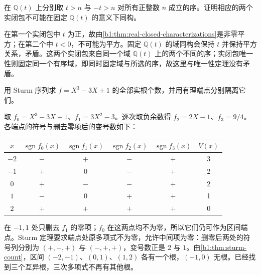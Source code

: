 \begin{exercise}\label{b1:ex:E-real-closure-order}
	在 \(\mathbb Q(t)\) 上分别取 \(t>n\) 与 \(-t>n\) 对所有正整数 \(n\) 成立的序。证明相应的两个实闭包不可能在固定 \(\mathbb Q(t)\) 的意义下同构。
\end{exercise}

\begin{solution}
	在第一个实闭包中 \(t\) 为正，故由\cref{b1:thm:real-closed-characterizations}是非零平方；在第二个中 \(t<0\)，不可能为平方。固定 \(\mathbb Q(t)\) 的域同构会保持 \(t\) 并保持平方关系，矛盾。这两个实闭包来自同一个域 \(\mathbb Q(t)\) 上的两个不同的序；实闭包唯一性则固定同一个有序域，即同时固定域与所选的序，故这里与唯一性定理没有矛盾。
\end{solution}

\begin{exercise}\label{b1:ex:E-sturm-cubic}
	用 Sturm 序列求 \(f=X^3-3X+1\) 的全部实根个数，并用有理端点分别隔离它们。
\end{exercise}

\begin{solution}
	取 \(f_0=X^3-3X+1\)、\(f_1=3X^2-3\)。逐次取负余数得 \(f_2=2X-1\)、\(f_3=9/4\)。各端点的符号与删去零项后的变号数如下：
	\begin{center}
		\begin{tabular}{c c c c c c}
			\toprule
			\(x\) & \(\operatorname{sgn}f_0(x)\) & \(\operatorname{sgn}f_1(x)\) & \(\operatorname{sgn}f_2(x)\) & \(\operatorname{sgn}f_3(x)\) & \(V(x)\) \\
			\midrule
			\(-2\) & \(-\) & \(+\) & \(-\) & \(+\) & 3 \\
			\(-1\) & \(+\) & \(0\) & \(-\) & \(+\) & 2 \\
			\(0\) & \(+\) & \(-\) & \(-\) & \(+\) & 2 \\
			\(1\) & \(-\) & \(0\) & \(+\) & \(+\) & 1 \\
			\(2\) & \(+\) & \(+\) & \(+\) & \(+\) & 0 \\
			\bottomrule
		\end{tabular}
	\end{center}
	在 \(-1,1\) 处只删去 \(f_1\) 的零项；\(f_0\) 在这两点均不为零，所以它们仍可作为区间端点。Sturm 定理要求端点处原多项式不为零，允许中间项为零：删零后两处的符号列分别为 \((+,-,+)\) 与 \((-,+,+)\)，变号数正是 \(2\) 与 \(1\)。由\cref{b1:thm:sturm-count}，区间 \((-2,-1)\)、\((0,1)\)、\((1,2)\) 各有一个根，\((-1,0)\) 无根。已经找到三个互异根，三次多项式不再有其他根。
\end{solution}

